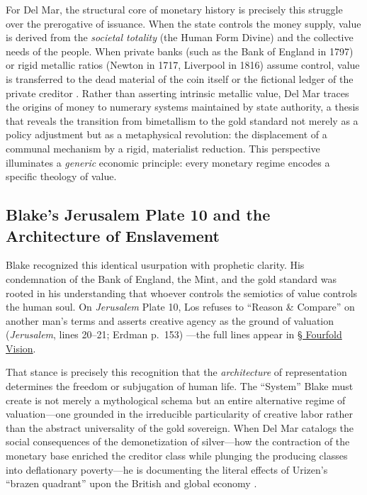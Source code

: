 \documentclass[
]{article}
\begin{document}
For Del Mar, the structural core of monetary history is precisely this
struggle over the prerogative of issuance. When the state controls the
money supply, value is derived from the \emph{societal totality} (the
Human Form Divine) and the collective needs of the people. When private
banks (such as the Bank of England in 1797) or rigid metallic ratios
(Newton in 1717, Liverpool in 1816) assume control, value is transferred
to the dead material of the coin itself or the fictional ledger of the
private creditor \citep{clapham1944bank}. Rather than asserting
intrinsic metallic value, Del Mar traces the origins of money to
numerary systems maintained by state authority, a thesis that reveals
the transition from bimetallism to the gold standard not merely as a
policy adjustment but as a metaphysical revolution: the displacement of
a communal mechanism by a rigid, materialist reduction. This perspective
illuminates a \emph{generic} economic principle: every monetary regime
encodes a specific theology of value.

\subsection{Blake's Jerusalem Plate 10 and the Architecture of
Enslavement}\label{blakes-jerusalem-plate-10-and-the-architecture-of-enslavement}

Blake recognized this identical usurpation with prophetic clarity. His
condemnation of the Bank of England, the Mint, and the gold standard was
rooted in his understanding that whoever controls the semiotics of value
controls the human soul. On \emph{Jerusalem} Plate 10, Los refuses to
``Reason \& Compare'' on another man's terms and asserts creative agency
as the ground of valuation (\emph{Jerusalem}, lines 20--21; Erdman
p.~153) \citep{erdman1988complete}---the full lines appear in
\hyperref[sec-four-levels-vision]{§ Fourfold Vision}.

That stance is precisely this recognition that the \emph{architecture}
of representation determines the freedom or subjugation of human life.
The ``System'' Blake must create is not merely a mythological schema but
an entire alternative regime of valuation---one grounded in the
irreducible particularity of creative labor rather than the abstract
universality of the gold sovereign. When Del Mar catalogs the social
consequences of the demonetization of silver---how the contraction of
the monetary base enriched the creditor class while plunging the
producing classes into deflationary poverty---he is documenting the
literal effects of Urizen's ``brazen quadrant'' upon the British and
global economy \citep{delmar1885history}.
\end{document}
